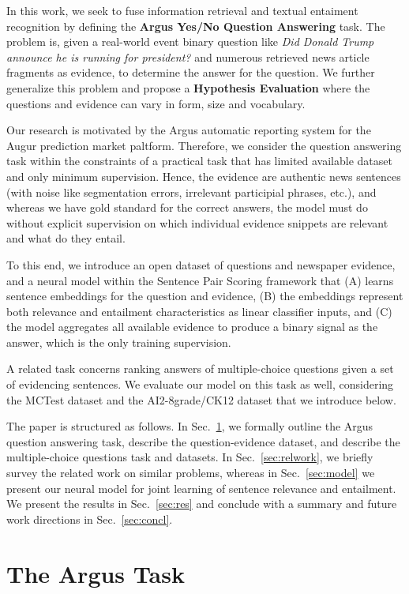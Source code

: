 \documentclass[11pt]{article}
\begin{document}
In this work, we seek to fuse information retrieval and textual entaiment
recognition by defining the \textbf{Argus Yes/No Question Answering} task.
The problem is, given a real-world event binary question like
\textit{Did Donald Trump announce he is running for president?}
and numerous retrieved news article fragments as evidence,
to determine the answer for the question.
We further generalize this problem and propose a \textbf{Hypothesis Evaluation}
where the questions and evidence can vary in form, size and vocabulary.

Our research is motivated by the Argus automatic reporting system for
the Augur prediction market paltform. \cite{argus}  Therefore, we consider the question answering task
within the constraints of a practical task that has limited available dataset
and only minimum supervision.  Hence, the evidence are authentic news
sentences (with noise like segmentation errors, irrelevant participial phrases, etc.),
and whereas we have gold standard for
the correct answers, the model must do without explicit supervision on
which individual evidence snippets are relevant and what do they entail.

To this end, we introduce an open dataset of questions and newspaper evidence,
and a neural model within the Sentence Pair Scoring framework \cite{sps}
that (A) learns sentence embeddings for the question and evidence,
(B) the embeddings represent both relevance and entailment characteristics
as linear classifier inputs, and (C) the model aggregates all available evidence
to produce a binary signal as the answer, which is the only training supervision.

A related task concerns ranking answers of multiple-choice questions given
a set of evidencing sentences.  We evaluate our model on this task as well,
considering the MCTest dataset and the AI2-8grade/CK12 dataset that we introduce
below.

The paper is structured as follows.  In Sec.~\ref{sec:argus}, we formally outline
the Argus question answering task, describe the question-evidence dataset,
and describe the multiple-choice questions task and datasets.
In Sec.~\ref{sec:relwork}, we briefly survey the related work on similar problems,
whereas in Sec.~\ref{sec:model} we present our neural model for joint
learning of sentence relevance and entailment.  We present the results in Sec.~\ref{sec:res}
and conclude with a summary and future work directions in Sec.~\ref{sec:concl}.

\section{The Argus Task}
\label{sec:argus}
\end{document}
